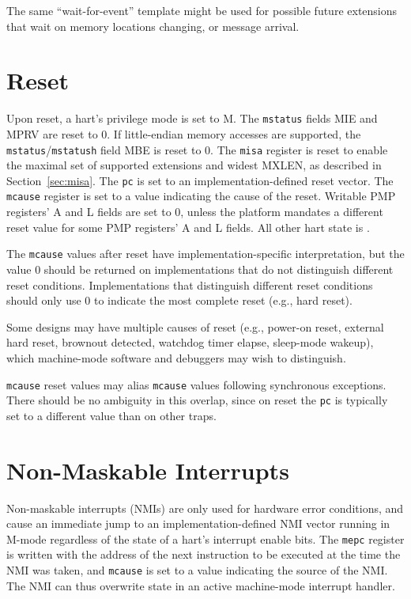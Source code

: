 \begin{commentary}
The same ``wait-for-event'' template might be used for possible future
extensions that wait on memory locations changing, or message
arrival.
\end{commentary}

\section{Reset}
\label{sec:reset}

Upon reset, a hart's privilege mode is set to M.  The {\tt mstatus} fields MIE
and MPRV are reset to 0.
If little-endian memory accesses are supported, the {\tt mstatus}/{\tt mstatush}
field MBE is reset to 0.
The {\tt misa} register is reset to enable the maximal set of supported
extensions and widest MXLEN, as described in Section~\ref{sec:misa}.
The {\tt pc} is set to an implementation-defined
reset vector.  The {\tt mcause} register is set to a value indicating the
cause of the reset.
Writable PMP registers' A and L fields are set to 0, unless the platform
mandates a different reset value for some PMP registers' A and L fields.
All other hart state is \unspecified.

The {\tt mcause} values after reset have implementation-specific
interpretation, but the value 0 should be returned on implementations
that do not distinguish different reset conditions. Implementations
that distinguish different reset conditions should only use 0 to
indicate the most complete reset (e.g., hard reset).

\begin{commentary}
Some designs may have multiple causes of reset (e.g., power-on reset,
external hard reset, brownout detected, watchdog timer elapse,
sleep-mode wakeup), which machine-mode software and debuggers may wish
to distinguish.

{\tt mcause} reset values may alias {\tt mcause} values following synchronous
exceptions.  There should be no ambiguity in this overlap, since on reset the
{\tt pc} is typically set to a different value than on other traps.
\end{commentary}

\section{Non-Maskable Interrupts}
\label{sec:nmi}

Non-maskable interrupts (NMIs) are only used for hardware error
conditions, and cause an immediate jump to an implementation-defined
NMI vector running in M-mode regardless of the state of a hart's
interrupt enable bits.  The {\tt mepc} register is written with the
address of the next instruction to be executed at the time the NMI was
taken, and {\tt mcause} is set to a value indicating the source of the
NMI.  The NMI can thus overwrite state in an active machine-mode
interrupt handler.

